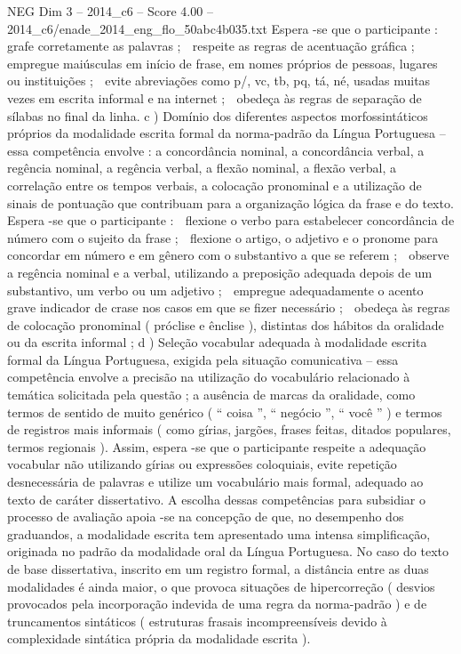 \begin{textsample}{NEG Dim 3 – 2014\_c6 – Score 4.00 – 2014\_c6/enade\_2014\_eng\_flo\_50abc4b035.txt}
Espera -se que o participante :  grafe corretamente as palavras ;  respeite as regras de acentuação gráfica ;  empregue maiúsculas em início de frase, em nomes próprios de pessoas, lugares ou instituições ;  evite abreviações como p/, vc, tb, pq, tá, né, usadas muitas vezes em escrita informal e na internet ;  obedeça às regras de separação de sílabas no final da linha. c ) Domínio dos diferentes aspectos morfossintáticos próprios da modalidade escrita formal da norma-padrão da Língua Portuguesa – essa competência envolve : a concordância nominal, a concordância verbal, a regência nominal, a regência verbal, a flexão nominal, a flexão verbal, a correlação entre os tempos verbais, a colocação pronominal e a utilização de sinais de pontuação que contribuam para a organização lógica da frase e do texto.
Espera -se que o participante :  flexione o verbo para estabelecer concordância de número com o sujeito da frase ;  flexione o artigo, o adjetivo e o pronome para concordar em número e em gênero com o substantivo a que se referem ;  observe a regência nominal e a verbal, utilizando a preposição adequada depois de um substantivo, um verbo ou um adjetivo ;  empregue adequadamente o acento grave indicador de crase nos casos em que se fizer necessário ;  obedeça às regras de colocação pronominal ( próclise e ênclise ), distintas dos hábitos da oralidade ou da escrita informal ; d ) Seleção vocabular adequada à modalidade escrita formal da Língua Portuguesa, exigida pela situação comunicativa – essa competência envolve a precisão na utilização do vocabulário relacionado à temática solicitada pela questão ; a ausência de marcas da oralidade, como termos de sentido de muito genérico ( “ coisa ”, “ negócio ”, “ você ” ) e termos de registros mais informais ( como gírias, jargões, frases feitas, ditados populares, termos regionais ).
Assim, espera -se que o participante respeite a adequação vocabular não utilizando gírias ou expressões coloquiais, evite repetição desnecessária de palavras e utilize um vocabulário mais formal, adequado ao texto de caráter dissertativo.
A escolha dessas competências para subsidiar o processo de avaliação apoia -se na concepção de que, no desempenho dos graduandos, a modalidade escrita tem apresentado uma intensa simplificação, originada no padrão da modalidade oral da Língua Portuguesa.
No caso do texto de base dissertativa, inscrito em um registro formal, a distância entre as duas modalidades é ainda maior, o que provoca situações de hipercorreção ( desvios provocados pela incorporação indevida de uma regra da norma-padrão ) e de truncamentos sintáticos ( estruturas frasais incompreensíveis devido à complexidade sintática própria da modalidade escrita ).

\end{textsample}
